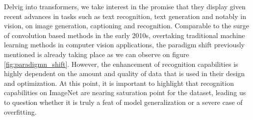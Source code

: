 \noindent Delvig into transformers, we take interest in the promise that they display 
given recent advances in tasks such as text recognition, text generation and notably in vision, 
on image generation, captioning and recognition. Comparable to the surge of convolution 
based methods in the early 2010s, overtaking traditional machine learning methods in computer 
vision applications, the paradigm shift previously mentioned is already taking place as 
we can observe on figure \autoref{fig:paradigmn_shift}. However, the enhancement of recognition 
capabilities is highly dependent on the amount and quality of data that is used in their 
design and optimization. At this point, it is important to highlight that recognition capabilities 
on ImageNet are nearing saturation point for the dataset, leading us to question whether it is 
truly a feat of model generalization or a severe case of overfitting.

